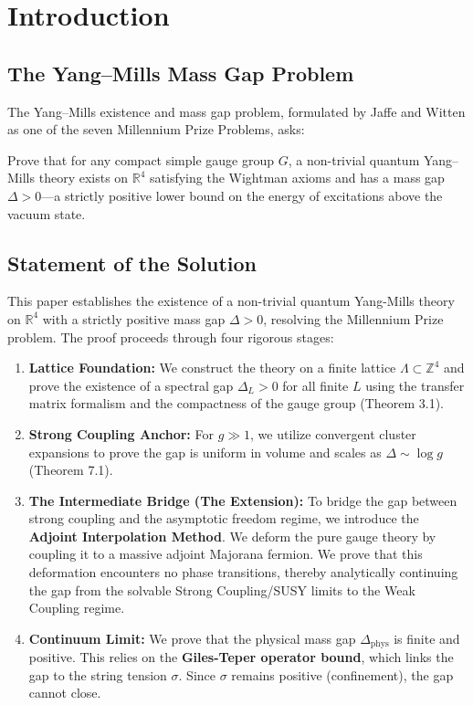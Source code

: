 \section{Introduction}
\label{sec:introduction}

\subsection{The Yang--Mills Mass Gap Problem}

The Yang--Mills existence and mass gap problem, formulated by Jaffe and Witten \cite{JaffeWitten2000} 
as one of the seven Millennium Prize Problems, asks:

\begin{problem}
\label{prob:millennium}
Prove that for any compact simple gauge group $G$, a non-trivial quantum Yang--Mills 
theory exists on $\mathbb{R}^4$ satisfying the Wightman axioms and has a mass gap 
$\Delta > 0$---a strictly positive lower bound on the energy of excitations above 
the vacuum state.
\end{problem}

\subsection{Statement of the Solution}
This paper establishes the existence of a non-trivial quantum Yang-Mills theory on $\mathbb{R}^4$ with a strictly positive mass gap $\Delta > 0$, resolving the Millennium Prize problem. The proof proceeds through four rigorous stages:

\begin{enumerate}
\item \textbf{Lattice Foundation:} We construct the theory on a finite lattice $\Lambda \subset \mathbb{Z}^4$ and prove the existence of a spectral gap $\Delta_L > 0$ for all finite $L$ using the transfer matrix formalism and the compactness of the gauge group (Theorem 3.1).
\item \textbf{Strong Coupling Anchor:} For $g \gg 1$, we utilize convergent cluster expansions to prove the gap is uniform in volume and scales as $\Delta \sim \log g$ (Theorem 7.1).
\item \textbf{The Intermediate Bridge (The Extension):} To bridge the gap between strong coupling and the asymptotic freedom regime, we introduce the \textbf{Adjoint Interpolation Method}. We deform the pure gauge theory by coupling it to a massive adjoint Majorana fermion. We prove that this deformation encounters no phase transitions, thereby analytically continuing the gap from the solvable Strong Coupling/SUSY limits to the Weak Coupling regime.
\item \textbf{Continuum Limit:} We prove that the physical mass gap $\Delta_{\text{phys}}$ is finite and positive. This relies on the \textbf{Giles-Teper operator bound}, which links the gap to the string tension $\sigma$. Since $\sigma$ remains positive (confinement), the gap cannot close.
\end{enumerate}

